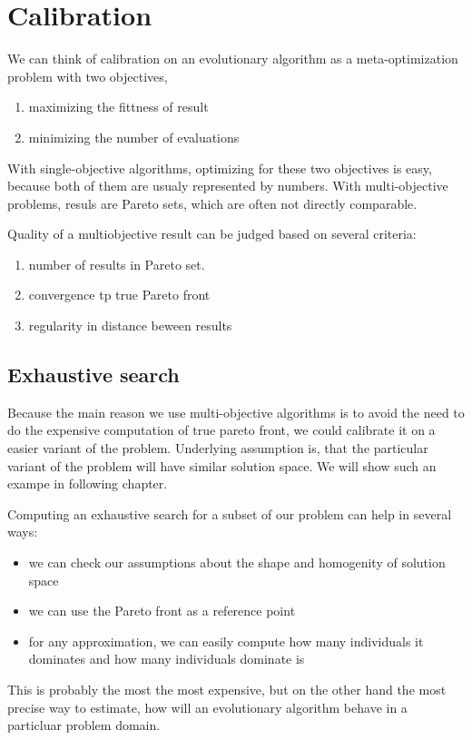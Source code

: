 \documentclass[12pt,oneside,draft]{fithesis2}
\begin{document}
\section{Calibration}

We can think of calibration on an evolutionary algorithm as a meta-optimization problem with two objectives,

\begin{enumerate}
\item maximizing the fittness of result
\item minimizing the number of evaluations
\end{enumerate}
With single-objective algorithms, optimizing for these two objectives is easy, because both of them are usualy represented by numbers.
With multi-objective problems, resuls are Pareto sets, which are often not directly comparable.

Quality of a multiobjective result can be judged based on several criteria:
\begin{enumerate}
\item number of results in Pareto set.
\item convergence tp true Pareto front
\item regularity in distance beween results
\end{enumerate}


\subsection{Exhaustive search}
Because the main reason we use multi-objective algorithms is to avoid the need to do the expensive computation of true pareto front,
we could calibrate it on a easier variant of the problem. Underlying assumption is, that the particular variant of the problem will have similar solution space. We will show such an exampe in following chapter.

Computing an exhaustive search for a subset of our problem can help in several ways:
\begin{itemize}
  \item we can check our assumptions about the shape and homogenity of solution space
  \item we can use the Pareto front as a reference point
  \item for any approximation, we can easily compute how many individuals it dominates and how many individuals dominate is
\end{itemize}

This is probably the most the most expensive, but on the other hand the most precise way to estimate, how will an evolutionary algorithm behave in a particluar problem domain.
\end{document}

